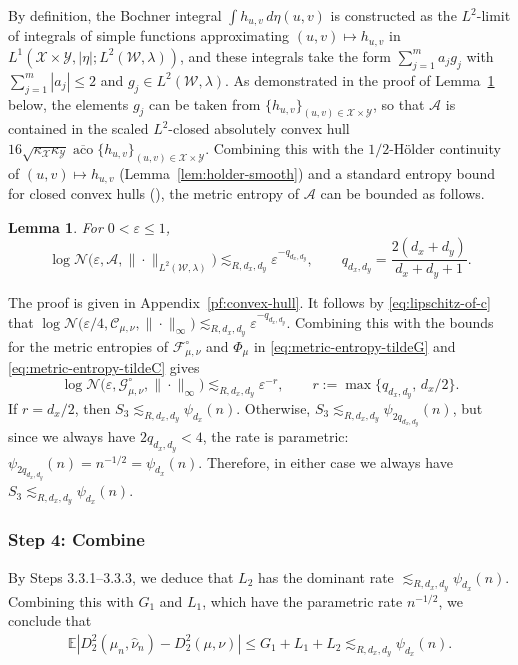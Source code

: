 \documentclass[11pt]{amsart}
\newtheorem{lemma}[theorem]{Lemma}
\theoremstyle{definition}
\theoremstyle{remark}
\newcommand{\E}{\mathbb{E}}
\newcommand{\1}{\mathbf{1}}
\numberwithin{equation}{section}
\begin{document}
By definition, the Bochner integral $\int h_{u,v}\,d\eta(u,v)$ is
constructed as the $L^2$-limit of integrals of simple functions
approximating $(u,v)\mapsto h_{u,v}$ in $L^1(\mathcal X\times\mathcal Y,|\eta|;L^2(\mathcal W,\lambda))$, and these integrals take
the form $\sum_{j=1}^{m}a_j g_j$ with $\sum_{j=1}^m|a_j|\le2$ and
$g_j\in L^2(\mathcal{W},\lambda)$. As demonstrated in the proof of
Lemma~\ref{lem:convex-hull} below, the elements $g_j$ can be taken from
$\{h_{u,v}\}_{(u,v)\in\mathcal{X}\times\mathcal{Y}}$, so that $\mathcal{A}$
is contained in the scaled $L^2$-closed absolutely convex hull
$16\sqrt{\kappa_\mathcal{X}\kappa_\mathcal{Y}}
\overline{\operatorname{aco}}\{h_{u,v}\}_{(u,v)\in\mathcal{X}\times\mathcal{Y}}$.
Combining this with the $1/2$-H\"older continuity of
$(u,v)\mapsto h_{u,v}$ (Lemma~\ref{lem:holder-smooth}) and a standard
entropy bound for closed convex hulls
(\cite[Theorem~2.6.9]{VanDerVaartWellner1996}), the metric entropy of
$\mathcal{A}$ can be bounded as follows.
\begin{lemma}\label{lem:convex-hull}
For $0<\varepsilon\le1$,
\[\log\mathcal N\bigl(\varepsilon,\mathcal{A},
\|\cdot\|_{L^2(\mathcal{W},\lambda)}\bigr)
\lesssim_{R,d_x,d_y} \varepsilon^{-q_{d_x,d_y}},\qquad
q_{d_x,d_y}=\frac{2(d_x+d_y)}{d_x+d_y+1}.\]
\end{lemma}
The proof is given in Appendix~\ref{pf:convex-hull}. It follows by
\eqref{eq:lipschitz-of-c} that
$\log \mathcal N\bigl(\varepsilon/4,\mathcal C_{\mu,\nu},
\|\cdot\|_\infty\bigr) \lesssim_{R,d_x,d_y} \varepsilon^{-q_{d_x,d_y}}$.
Combining this with the bounds for the metric entropies of $\mathcal F^\circ_{\mu,\nu}$ and $\Phi_{\mu}$ in
\eqref{eq:metric-entropy-tildeG} and \eqref{eq:metric-entropy-tildeC}
gives
\[\log \mathcal N\bigl(\varepsilon,\mathcal G^\circ_{\mu,\nu},
\|\cdot\|_\infty\bigr) \lesssim_{R,d_x,d_y} \varepsilon^{-r},
\qquad r := \max\{q_{d_x,d_y},\, d_x/2\}.\]
If $r = d_x/2$, then $S_3 \lesssim_{R,d_x,d_y} \psi_{d_x}(n)$. Otherwise,
$S_3 \lesssim_{R,d_x,d_y} \psi_{2q_{d_x,d_y}}(n)$, but since we always have
$2q_{d_x,d_y} < 4$, the rate is parametric:
$\psi_{2q_{d_x,d_y}}(n) = n^{-1/2} = \psi_{d_x}(n)$. Therefore, in either
case we always have $S_3 \lesssim_{R,d_x,d_y} \psi_{d_x}(n)$.

\subsubsection*{Step 4: Combine}
By Steps 3.3.1--3.3.3, we deduce that $L_2$ has the dominant rate
$\lesssim_{R,d_x,d_y} \psi_{d_x}(n)$. Combining this with $G_1$ and $L_1$, which have the parametric
rate $n^{-1/2}$, we conclude that
\begin{align*}
    \E |D_2^2(\widehat\mu_n, \widehat\nu_n) - D_2^2(\mu, \nu)|
    \leq G_1 + L_1 + L_2
    \lesssim_{R,d_x,d_y} \psi_{d_x}(n).
\end{align*}
\end{document}
